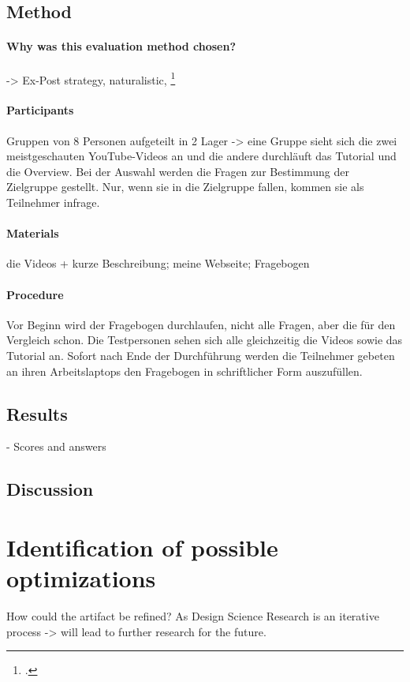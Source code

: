 \subsection{Method} \label{subsec:EvaluationMethod}

\paragraph{Why was this evaluation method chosen?} -> Ex-Post strategy, naturalistic, 
\footcite{PfeffersDesignScienceResearch2012} \cite{Pries-HejeComprehensiveFrameworkEvaluation2012} \cite{Pries-HejeStrategiesDesignScience}

\paragraph{Participants}
Gruppen von 8 Personen aufgeteilt in 2 Lager -> eine Gruppe sieht sich die zwei meistgeschauten YouTube-Videos an und die andere durchläuft das Tutorial und die Overview.
Bei der Auswahl werden die Fragen zur Bestimmung der Zielgruppe gestellt. Nur, wenn sie in die Zielgruppe fallen, kommen sie als Teilnehmer infrage.

\paragraph{Materials}
die Videos + kurze Beschreibung;
meine Webseite;
Fragebogen
\paragraph{Procedure}
Vor Beginn wird der Fragebogen durchlaufen, nicht alle Fragen, aber die für den Vergleich schon.
Die Testpersonen sehen sich alle gleichzeitig die Videos sowie das Tutorial an.
Sofort nach Ende der Durchführung werden die Teilnehmer gebeten an ihren Arbeitslaptops den Fragebogen in schriftlicher Form auszufüllen. 


\subsection{Results} \label{subsec:EvaluationResults}
- Scores and answers

\subsection{Discussion}

\section{Identification of possible optimizations} \label{sec:Optimizations}

How could the artifact be refined? As Design Science Research is an iterative process -> will lead to further research for the future.
